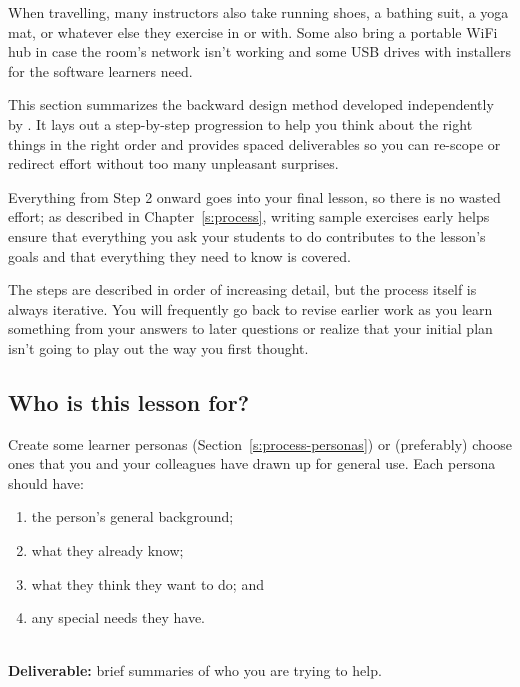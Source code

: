 When travelling,
many instructors also take running shoes, a bathing suit, a yoga mat,
or whatever else they exercise in or with.
Some also bring a portable WiFi hub in case the room's network isn't working
and some USB drives with installers for the software learners need.


This section summarizes the backward design method
developed independently by \cite{Wigg2005,Bigg2011,Fink2013}.
It lays out a step-by-step progression
to help you think about the right things in the right order
and provides spaced deliverables
so you can re-scope or redirect effort without too many unpleasant surprises.

Everything from Step 2 onward goes into your final lesson,
so there is no wasted effort;
as described in Chapter~\ref{s:process},
writing sample exercises early helps ensure that
everything you ask your students to do contributes to the lesson's goals
and that everything they need to know is covered.

The steps are described in order of increasing detail,
but the process itself is always iterative.
You will frequently go back to revise earlier work
as you learn something from your answers to later questions
or realize that your initial plan isn't going to play out the way you first thought.

\subsection*{Who is this lesson for?}

Create some learner personas (Section~\ref{s:process-personas})
or (preferably) choose ones that you and your colleagues have drawn up for general use.
Each persona should have:

\begin{enumerate}

\item
  the person's general background;

\item
  what they already know;

\item
  what they think they want to do; and

\item
  any special needs they have.

\end{enumerate}

~\\
\noindent
\textbf{Deliverable:} brief summaries of who you are trying to help.

